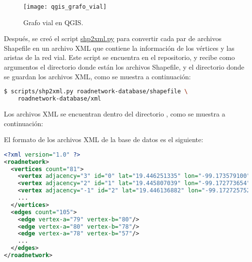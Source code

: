 \begin{figure}[th!]
\centering
\texttt{[image: qgis\_grafo\_vial]}
\decoRule
\caption[Grafo vial en QGIS]{Grafo vial en QGIS.}
\label{fig:qgis_grafo_vial}
\end{figure}

Después, se creó el script
\href{https://gitlab.com/Comecacahuates/simulacion-protocolo-erutamiento/-/blob/main/scripts/shp2xml.py}{shp2xml.py}
para convertir cada par de archivos Shapefile en un archivo XML que contiene la
información de los vértices y las aristas de la red vial. Este script se
encuentra en el repositorio, y recibe como argumentos el directorio donde están
los archivos Shapefile, y el directorio donde se guardan los archivos XML, como
se muestra a continuación:

\begin{lstlisting}[language=bash]
$ scripts/shp2xml.py roadnetwork-database/shapefile \
    roadnetwork-database/xml
\end{lstlisting}

Los archivos XML se encuentran dentro del directorio
, como se muestra a continuación:

\newpage


El formato de los archivos XML de la base de datos es el siguiente:

\begin{lstlisting}[language=XML]
<?xml version="1.0" ?>
<roadnetwork>
  <vertices count="81">
    <vertex adjacency="3" id="0" lat="19.446251335" lon="-99.173579100"/>
    <vertex adjacency="2" id="1" lat="19.445807039" lon="-99.172773654"/>
    <vertex adjacency="-1" id="2" lat="19.446136882" lon="-99.172725752"/>
    ...
  </vertices>
  <edges count="105">
    <edge vertex-a="79" vertex-b="80"/>
    <edge vertex-a="80" vertex-b="78"/>
    <edge vertex-a="78" vertex-b="57"/>
    ...
  </edges>
</roadnetwork>
\end{lstlisting}

